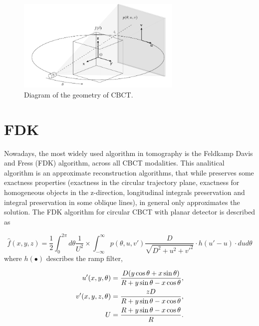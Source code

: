 \begin{figure}[H]
\begin{center}

\includegraphics[width=0.7\textwidth]{RecAlgorithms/geo.pdf} 
\end{center}

\caption[Diagram of the geometry of CBCT]{\label{fig:geo} Diagram of the geometry of CBCT.} 
\end{figure}


\section{FDK}\label{sec:FDK}
Nowadays, the most widely used algorithm in tomography is the Feldkamp Davis and Fress (FDK) algorithm\cite{Feldkamp1984}, across all CBCT modalities. This analitical algorithm is an approximate reconstruction algorithms, that while preserves some exactness properties (exactness in the circular trajectory plane\cite{Feldkamp1984}, exactness for homogeneous objects in the z-direction, longitudinal integrals preservation and integral preservation in some oblique lines\cite{li2006general}), in general only approximates the solution. The FDK algorithm for circular CBCT with planar detector is described as

\begin{equation}
\hat{f}(x,y,z)=\frac{1}{2}\int_{0}^{2\pi}d\theta \frac{1}{U^2} \times \int_{-\infty}^{\infty}p(\theta,u,v') \frac{D}{\sqrt{D^2+u^2+v'^2}} \cdot h(u'-u)\cdot dud\theta
\end{equation}
where $h(\bullet)$ describes the ramp filter, 

\begin{align}
u'(x,y,\theta)&=\frac{D(y\cos\theta+x\sin\theta)}{R+y\sin\theta-x\cos\theta},\notag\\
v'(x,y,z,\theta)&=\frac{zD}{R+y\sin\theta-x\cos\theta},\notag\\
U&=\frac{R+y\sin\theta-x\cos\theta}{R}.
\label{eq:weigth}
\end{align}



